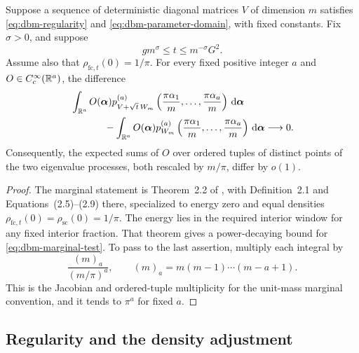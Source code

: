 \begin{theorem}
\label{thm:dbm-input}
Suppose a sequence of deterministic diagonal matrices \(V\) of dimension
\(m\) satisfies \eqref{eq:dbm-regularity} and
\eqref{eq:dbm-parameter-domain}, with fixed constants. Fix \(\sigma>0\),
and suppose
\begin{equation}
 \label{eq:dbm-time-window}
 g m^\sigma\le t\le m^{-\sigma}G^2.
\end{equation}
Assume also that \(\rho_{\mathrm{fc},t}(0)=1/\pi\).
For every fixed positive integer \(a\) and
\(O\in C_c^\infty(\mathbb R^a)\), the difference
\begin{align}
 \label{eq:dbm-marginal-test}
 &\int_{\R^a}O(\boldsymbol\alpha)
   p_{V+\sqrt t\,W_m}^{(a)}
      \left(\frac{\pi\alpha_1}{m},\ldots,
            \frac{\pi\alpha_a}{m}\right)
       \dd\boldsymbol\alpha \notag\\
 &\hspace{12mm}-
 \int_{\R^a}O(\boldsymbol\alpha)
   p_{W_m}^{(a)}
      \left(\frac{\pi\alpha_1}{m},\ldots,
            \frac{\pi\alpha_a}{m}\right)
       \dd\boldsymbol\alpha
 \longrightarrow0.
\end{align}
Consequently, the expected sums of \(O\) over ordered tuples of
distinct points of the two eigenvalue processes, both rescaled by
\(m/\pi\), differ by \(o(1)\).
\end{theorem}

\begin{proof}
The marginal statement is Theorem~2.2 of
\citet{LandonSosoeYau}, with Definition~2.1 and Equations~(2.5)--(2.9)
there, specialized to energy zero and equal densities
\(\rho_{\mathrm{fc},t}(0)=\rho_{\mathrm{sc}}(0)=1/\pi\).
The energy lies in the required interior window for any fixed interior
fraction. That theorem gives a power-decaying bound for
\eqref{eq:dbm-marginal-test}. To pass to the last assertion, multiply
each integral by
\[
 \frac{(m)_a}{(m/\pi)^a},
 \qquad
 (m)_a=m(m-1)\cdots(m-a+1).
\]
This is the Jacobian and ordered-tuple multiplicity for the unit-mass
marginal convention, and it tends to \(\pi^a\) for fixed \(a\).
\end{proof}

\subsection{Regularity and the density adjustment}

